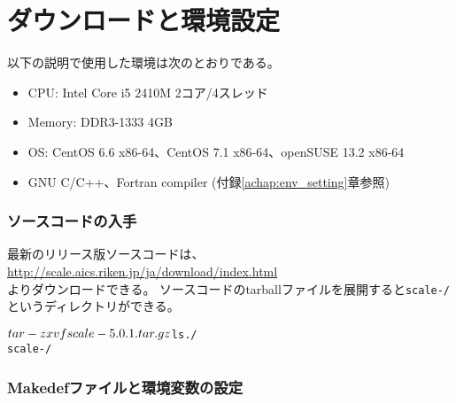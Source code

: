 
\section{ダウンロードと環境設定} \label{sec:scale_compile}

以下の説明で使用した環境は次のとおりである。
\begin{itemize}
\item CPU: Intel Core i5 2410M 2コア/4スレッド
\item Memory: DDR3-1333 4GB
\item OS: CentOS 6.6 x86-64、CentOS 7.1 x86-64、openSUSE 13.2 x86-64
\item GNU C/C++、Fortran compiler (付録\ref{achap:env_setting}章参照)
\end{itemize}

\subsubsection{ソースコードの入手} \label{subsec:get_source_code}
最新のリリース版ソースコードは、\\
\url{http://scale.aics.riken.jp/ja/download/index.html}\\
よりダウンロードできる。
ソースコードのtarballファイルを展開すると\texttt{scale-{\version}/} というディレクトリができる。
\begin{alltt}
 $ tar -zxvf scale-{\version}.tar.gz
 $ ls ./
    scale-{\version}/
\end{alltt}

\subsubsection{Makedefファイルと環境変数の設定} \label{subsec:environment}

